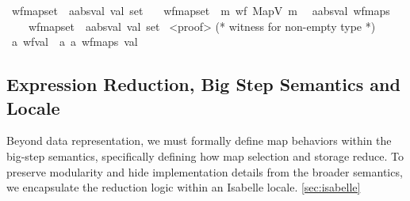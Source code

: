 \begin{isabellebody}
\isamarkupfalse%
\ wf{\isacharunderscore}{\kern0pt}map{\isacharunderscore}{\kern0pt}set\ {\isacharcolon}{\kern0pt}{\isacharcolon}{\kern0pt}\ {\isachardoublequoteopen}{\isacharprime}{\kern0pt}a{\isacharcolon}{\kern0pt}{\isacharcolon}{\kern0pt}absval\ val{}{}{}\ set{\isachardoublequoteclose}\ \isanewline
\ \ {\isachardoublequoteopen}wf{\isacharunderscore}{\kern0pt}map{\isacharunderscore}{\kern0pt}set\ {\isacharequal}{\kern0pt}\ {\isacharbraceleft}{\kern0pt}m{\isachardot}{\kern0pt}\ wf\ {\isacharparenleft}{\kern0pt}MapV\ m{\isacharparenright}{\kern0pt}{\isacharbraceright}{\kern0pt}{\isachardoublequoteclose}\isanewline
\isanewline
\isamarkupfalse%
\ {\isacharparenleft}{\kern0pt}\ {\isacharprime}{\kern0pt}a{\isacharcolon}{\kern0pt}{\isacharcolon}{\kern0pt}absval\ wf{\isacharunderscore}{\kern0pt}maps\isanewline
\ \ \ {\isacharequal}{\kern0pt}\ {\isachardoublequoteopen}wf{\isacharunderscore}{\kern0pt}map{\isacharunderscore}{\kern0pt}set\ {\isacharcolon}{\kern0pt}{\isacharcolon}{\kern0pt}\ {\isacharprime}{\kern0pt}a{\isacharcolon}{\kern0pt}{\isacharcolon}{\kern0pt}absval\ val{}{}{}\ set{\isachardoublequoteclose}\isanewline
\ <proof> (* witness for non-empty type *)\isanewline
\isanewline
\isamarkupfalse%
\ {\isacharprime}{\kern0pt}a\ wf{\isacharunderscore}{\kern0pt}val\ {\isacharequal}{\kern0pt}\ {\isachardoublequoteopen}{\isacharparenleft}{\kern0pt}{\isacharprime}{\kern0pt}a{\isacharcomma}{\kern0pt}\ {\isacharprime}{\kern0pt}a\ wf{\isacharunderscore}{\kern0pt}maps{\isacharparenright}{\kern0pt}\ val{\isachardoublequoteclose}%
\end{isabellebody}



\subsection{Expression Reduction, Big Step Semantics and Locale}

Beyond data representation, we must formally define map behaviors within the big-step semantics,
specifically defining how map selection and storage reduce.
To preserve modularity and hide implementation details from the broader semantics,
we encapsulate the reduction logic within an Isabelle locale. \ref{sec:isabelle}

